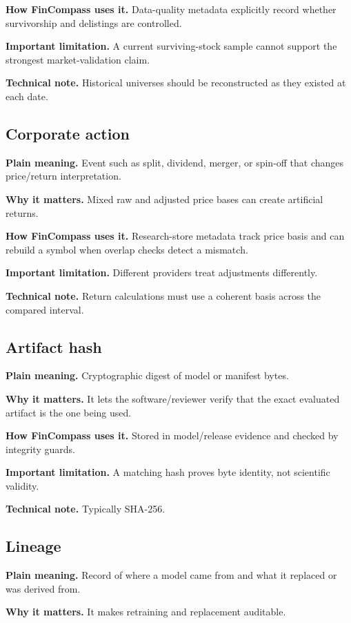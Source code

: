 \documentclass[11pt]{article}
\begin{document}
\textbf{How FinCompass uses it.} Data-quality metadata explicitly record whether survivorship and delistings are controlled.

\textbf{Important limitation.} A current surviving-stock sample cannot support the strongest market-validation claim.

\textbf{Technical note.} Historical universes should be reconstructed as they existed at each date.

\subsection{Corporate action}
\textbf{Plain meaning.} Event such as split, dividend, merger, or spin-off that changes price/return interpretation.

\textbf{Why it matters.} Mixed raw and adjusted price bases can create artificial returns.

\textbf{How FinCompass uses it.} Research-store metadata track price basis and can rebuild a symbol when overlap checks detect a mismatch.

\textbf{Important limitation.} Different providers treat adjustments differently.

\textbf{Technical note.} Return calculations must use a coherent basis across the compared interval.

\subsection{Artifact hash}
\textbf{Plain meaning.} Cryptographic digest of model or manifest bytes.

\textbf{Why it matters.} It lets the software/reviewer verify that the exact evaluated artifact is the one being used.

\textbf{How FinCompass uses it.} Stored in model/release evidence and checked by integrity guards.

\textbf{Important limitation.} A matching hash proves byte identity, not scientific validity.

\textbf{Technical note.} Typically SHA-256.

\subsection{Lineage}
\textbf{Plain meaning.} Record of where a model came from and what it replaced or was derived from.

\textbf{Why it matters.} It makes retraining and replacement auditable.
\end{document}

